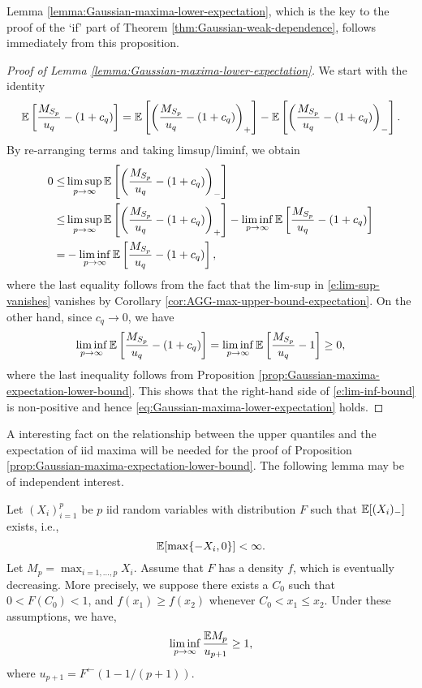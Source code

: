 Lemma \ref{lemma:Gaussian-maxima-lower-expectation}, which is the key to the proof of the `if' part of Theorem \ref{thm:Gaussian-weak-dependence}, follows immediately from this proposition.

\begin{proof}[Proof of Lemma \ref{lemma:Gaussian-maxima-lower-expectation}]
We start with the identity
$$
{\mathbb E}\left[\frac{M_{S_p}}{u_q}-(1+c_q)\right] = {\mathbb E}\left[\left(\frac{M_{S_p}}{u_q}-(1+c_q)\right)_+\right] - {\mathbb E}\left[\left(\frac{M_{S_p}}{u_q}-(1+c_q)\right)_-\right].
$$
By re-arranging terms and taking limsup/liminf, we obtain
\begin{align} \label{e:lim-sup-vanishes}
    0 \le &\limsup_{p\to\infty}{\mathbb E}\left[\left(\frac{M_{S_p}}{u_q}-(1+c_q)\right)_-\right]\nonumber \\
        \le & \limsup_{p\to\infty}{\mathbb E}\left[\left(\frac{M_{S_p}}{u_q}-(1+c_q)\right)_+\right] - \liminf_{p\to\infty}{\mathbb E}\left[\frac{M_{S_p}}{u_q}-(1+c_q)\right]\\
        = & - \liminf_{p\to\infty}{\mathbb E}\left[\frac{M_{S_p}}{u_q}-(1+c_q)\right],
        \label{e:lim-inf-bound}
\end{align}
where the last equality follows from the fact that the lim-sup in \eqref{e:lim-sup-vanishes} vanishes by Corollary \ref{cor:AGG-max-upper-bound-expectation}.
On the other hand, since $c_q\to 0$, we have
$$
\liminf_{p\to\infty}{\mathbb E}\left[\frac{M_{S_p}}{u_q}-(1+c_q)\right] 
= \liminf_{p\to\infty}{\mathbb E}\left[\frac{M_{S_p}}{u_q}-1\right] \ge 0,
$$
where the last inequality follows from Proposition \ref{prop:Gaussian-maxima-expectation-lower-bound}.  This shows that 
the right-hand side of \eqref{e:lim-inf-bound} is non-positive and hence
\eqref{eq:Gaussian-maxima-lower-expectation} holds. 
\end{proof}

A interesting fact on the relationship between the upper quantiles and the expectation of iid maxima will be needed for the proof of  Proposition \ref{prop:Gaussian-maxima-expectation-lower-bound}.
The following lemma may be of independent interest.

\begin{lemma} \label{lemma:expectation-lower}
Let $(X_i)_{i=1}^p$ be $p$ iid random variables with distribution $F$ such that ${\mathbb E}[(X_i)_-]$ exists, i.e.,
$$
{\mathbb E}[\max\{-X_i, 0\}] < \infty.
$$
Let $M_p = \max_{i=1,\ldots,p}X_i$. Assume that $F$ has a density $f$, which is eventually decreasing. 
More precisely, we suppose there exists a 
$C_0$ such that $0<F(C_0)<1$, and $f(x_1) \ge f(x_2)$ whenever $C_0 < x_1 \le x_2$. 
Under these assumptions, we have,
$$
\liminf_{p\to\infty}\frac{{\mathbb E} M_p}{u_{p+1}} \ge 1,
$$
where $u_{p+1} = F^{\leftarrow}(1 - 1/(p+1))$.
\end{lemma}


